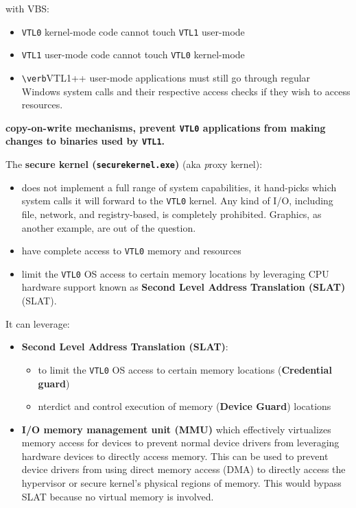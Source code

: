 with VBS:
\begin{itemize}
    \item \verb+VTL0+ kernel-mode code cannot touch \verb+VTL1+ user-mode  
    \item \verb+VTL1+ user-mode code cannot touch \verb+VTL0+ kernel-mode 
    \item \verb+\verb+VTL1++ user-mode applications must still go through regular Windows system calls and their respective access checks if they wish to access resources.
\end{itemize}

{\bf copy-on-write mechanisms, prevent \verb+VTL0+ applications from making changes to binaries used by \verb+VTL1+.}

The {\bf secure kernel (\verb+securekernel.exe+)} (aka {\emph proxy kernel}):
\begin{itemize}
    \item does not implement a full range of system capabilities, it hand-picks which system calls it will forward to the \verb+VTL0+ kernel. Any kind of I/O, including file, network, and registry-based, is completely prohibited. Graphics, as another example, are out of the question.
    \item have complete access to \verb+VTL0+ memory and resources
    \item limit the \verb+VTL0+ OS access to certain memory locations by leveraging CPU hardware support known as {\bf Second Level Address Translation (SLAT)}
    (SLAT).
\end{itemize} 

It can leverage:
\begin{itemize}
    \item {\bf Second Level Address Translation (SLAT)}:
        \begin{itemize}
            \item to limit the \verb+VTL0+ OS access to certain memory locations ({\bf Credential guard})
            \item nterdict and control execution of memory ({\bf Device Guard}) locations
        \end{itemize}
    \item {\bf I/O memory management unit (MMU)} which effectively virtualizes memory access for devices to prevent normal device drivers from leveraging hardware devices to directly access memory. This can be used to prevent device drivers from using direct memory access (DMA) to directly access the hypervisor or secure kernel’s physical regions of memory. This would bypass SLAT because no virtual memory is involved.
\end{itemize}

